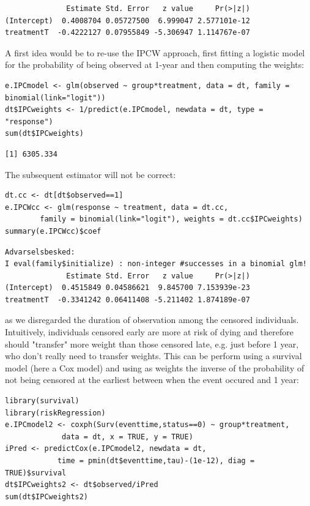 \documentclass[12pt]{article}
\begin{document}
\begin{verbatim}
              Estimate Std. Error   z value     Pr(>|z|)
(Intercept)  0.4008704 0.05727500  6.999047 2.577101e-12
treatmentT  -0.4222127 0.07955849 -5.306947 1.114767e-07
\end{verbatim}


A first idea would be to re-use the IPCW approach, first fitting a
logistic model for the probability of being observed at 1-year and
then computing the weights:
\lstset{language=r,label= ,caption= ,captionpos=b,numbers=none}
\begin{lstlisting}
e.IPCmodel <- glm(observed ~ group*treatment, data = dt, family = binomial(link="logit"))
dt$IPCweights <- 1/predict(e.IPCmodel, newdata = dt, type = "response")
sum(dt$IPCweights)
\end{lstlisting}

\begin{verbatim}
[1] 6305.334
\end{verbatim}


The subsequent estimator will not be correct: 
\lstset{language=r,label= ,caption= ,captionpos=b,numbers=none}
\begin{lstlisting}
dt.cc <- dt[dt$observed==1]
e.IPCWcc <- glm(response ~ treatment, data = dt.cc,
		family = binomial(link="logit"), weights = dt.cc$IPCweights)
summary(e.IPCWcc)$coef
\end{lstlisting}

\begin{verbatim}
Advarselsbesked:
I eval(family$initialize) : non-integer #successes in a binomial glm!
              Estimate Std. Error   z value     Pr(>|z|)
(Intercept)  0.4515849 0.04586621  9.845700 7.153939e-23
treatmentT  -0.3341242 0.06411408 -5.211402 1.874189e-07
\end{verbatim}


as we disregarded the duration of observation among the censored
individuals. Intuitively, individuals censored early are more at risk
of dying and therefore should "transfer" more weight than those
censored late, e.g. just before 1 year, who don't really need to
transfer weights. This can be perform using a survival model (here a
Cox model) and using as weights the inverse of the probability of not
being censored at the earliest between when the event occured and 1
year:
\lstset{language=r,label= ,caption= ,captionpos=b,numbers=none}
\begin{lstlisting}
library(survival)
library(riskRegression)
e.IPCmodel2 <- coxph(Surv(eventtime,status==0) ~ group*treatment,
		     data = dt, x = TRUE, y = TRUE)
iPred <- predictCox(e.IPCmodel2, newdata = dt,
		    time = pmin(dt$eventtime,tau)-(1e-12), diag = TRUE)$survival
dt$IPCweights2 <- dt$observed/iPred
sum(dt$IPCweights2)
\end{lstlisting}
\end{document}
